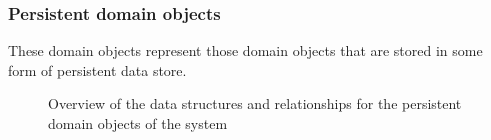 \documentclass[12pt]{article}
\begin{document}
\subsubsection{Persistent domain objects}
These domain objects represent those domain objects that are stored in some form of persistent data store.
\begin{figure}[H]
\centering	
{}
\caption{Overview of the data structures and relationships for the persistent domain objects of the
system}
\end{figure}
\end{document}

